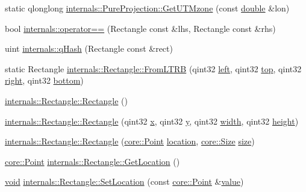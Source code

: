 \begin{DoxyCompactItemize}
\item 
static qlonglong \hyperlink{group___o_p_map_widget_ga4fe99842f3ee0de090c40b11999ab860}{internals\-::\-Pure\-Projection\-::\-Get\-U\-T\-Mzone} (const \hyperlink{_super_l_u_support_8h_a8956b2b9f49bf918deed98379d159ca7}{double} \&lon)
\item 
bool \hyperlink{group___o_p_map_widget_ga21e50fddd3ab15ded36e81275f3cac32}{internals\-::operator==} (Rectangle const \&lhs, Rectangle const \&rhs)
\item 
uint \hyperlink{group___o_p_map_widget_ga3b14f5cf9824e116a9b2dbd3aceaf7c3}{internals\-::q\-Hash} (Rectangle const \&rect)
\item 
static Rectangle \hyperlink{group___o_p_map_widget_gabe5c3b8c9edda8d902d997d47d9dc795}{internals\-::\-Rectangle\-::\-From\-L\-T\-R\-B} (qint32 \hyperlink{glext_8h_a85b8f6c07fbc1fb5d77c2ae090f21995}{left}, qint32 \hyperlink{glext_8h_a5ab323daeacf8dfdb8f91132fecdca23}{top}, qint32 \hyperlink{glext_8h_a5ffadbbacc6b89cf6218bc43b384d3fe}{right}, qint32 \hyperlink{glext_8h_a95fc257e5ddf46f7db9d5e898cdf1991}{bottom})
\item 
\hyperlink{group___o_p_map_widget_ga03611c46b536e7a99cbdbc186e3dff19}{internals\-::\-Rectangle\-::\-Rectangle} ()
\item 
\hyperlink{group___o_p_map_widget_ga4c4f49dc7eb25d83f3289fe29b2b4cd1}{internals\-::\-Rectangle\-::\-Rectangle} (qint32 \hyperlink{glext_8h_a1db9d104e3c2128177f26aff7b46982f}{x}, qint32 \hyperlink{glext_8h_a42315f3ed8fff752bb47fd782309fcfc}{y}, qint32 \hyperlink{glext_8h_a76aaa5c50746272e7d2de9aece921757}{width}, qint32 \hyperlink{glext_8h_ae23e72c69f79d0aa647aa7929ef3f232}{height})
\item 
\hyperlink{group___o_p_map_widget_ga1d494138f0b6c0ba9d64a3b5dd0e076c}{internals\-::\-Rectangle\-::\-Rectangle} (\hyperlink{structcore_1_1_point}{core\-::\-Point} \hyperlink{glext_8h_a6f0165ed903f22b8bb600c3e0b628e73}{location}, \hyperlink{structcore_1_1_size}{core\-::\-Size} \hyperlink{glext_8h_a014d89bd76f74ef3a29c8f04b473eb76}{size})
\item 
\hyperlink{structcore_1_1_point}{core\-::\-Point} \hyperlink{group___o_p_map_widget_ga9dcbcbee1c0e91b3dfd3338a9a464d84}{internals\-::\-Rectangle\-::\-Get\-Location} ()
\item 
\hyperlink{group___u_a_v_objects_plugin_ga444cf2ff3f0ecbe028adce838d373f5c}{void} \hyperlink{group___o_p_map_widget_ga7d71ff294aa5fdf0878e8c79a8b07725}{internals\-::\-Rectangle\-::\-Set\-Location} (const \hyperlink{structcore_1_1_point}{core\-::\-Point} \&\hyperlink{glext_8h_aa0e2e9cea7f208d28acda0480144beb0}{value})

\end{DoxyCompactItemize}
